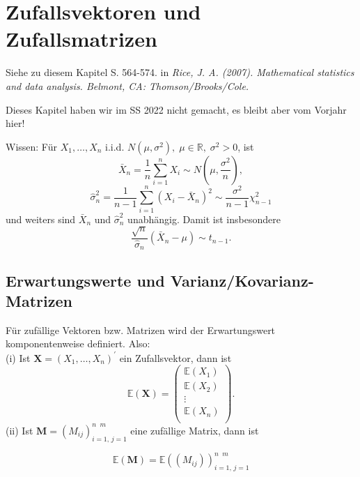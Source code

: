 \documentclass{tstextbook}
\begin{document}
	
	

\chapter{Zufallsvektoren und Zufallsmatrizen}

\begin{book}
	Siehe zu diesem Kapitel S. 564-574. in \textit{Rice, J. A. (2007). Mathematical statistics and data analysis. Belmont, CA: Thomson/Brooks/Cole.} 
\end{book}

\begin{remark}
	
	Dieses Kapitel haben wir im SS 2022 nicht gemacht, es bleibt aber vom Vorjahr hier!
	
\end{remark}


\begin{remark}
	Wissen: Für $ X_1, \ldots ,X_n $ i.i.d. $ N(\mu,\sigma^{2}), \; \mu\in\mathbb{R}, \; \sigma^2 > 0 $, ist 
	\[ \bar{X}_n = \frac{1}{n} \sum_{i=1}^{n} X_i \sim N\left(\mu, \frac{\sigma^2}{n} \right),
	\] 
	\[ \hat{\sigma}_n^2 = \frac{1}{n-1} \sum_{i=1}^{n} ( X_i - \bar{X}_n)^2 \sim \frac{\sigma^2}{n-1} \chi_{n-1}^2 
	\]  
	und weiters sind $ \bar{X}_n $  und $ \hat{\sigma}^2_n $ unabhängig. Damit ist insbesondere 
	\[ \frac{\sqrt{n}}{\hat{\sigma}_n}(\bar{X}_n-\mu) \sim t_{n-1}.
	\]
	
\end{remark}


\section{Erwartungswerte und Varianz/Kovarianz-Matrizen} 


\begin{definition}[Erwartungswert]
	Für zufällige Vektoren bzw. Matrizen wird der Erwartungswert komponentenweise definiert. Also: \\
	(i) Ist $ \textbf{X}= \left(X_1, \ldots ,X_n\right)^\prime $  ein Zufallsvektor, dann ist 
\[ \mathbb{E}(\textbf{X}) = \begin{pmatrix} \mathbb{E}(X_1)\\
		\mathbb{E}(X_2)\\
		\vdots\\
		\mathbb{E}(X_n)\\
	\end{pmatrix}.
\]
	(ii) Ist $ \textbf{M}=(M_{ij})_{i=1,\, j=1}^{n \;\; m} $ eine zufällige Matrix, dann ist 
	
\[ 
\mathbb{E}(\textbf{M})= \mathbb{E} \left((M_{ij})\right)_{i=1,\, j=1}^{n \;\; m}	
\]
\end{definition}
\end{document}
